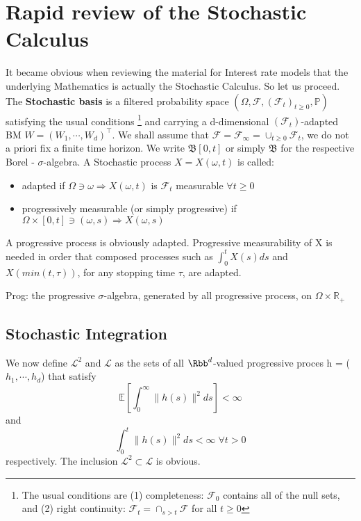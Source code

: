 \section{Rapid review of the Stochastic Calculus}
It became obvious when reviewing the material for Interest rate models that the underlying Mathematics is actually
the Stochastic Calculus. So let us proceed. 
The \textbf{Stochastic basis} is a filtered probability space $(\Omega, \mathcal{F}, (\mathcal{F}_{t})_{t \geq 0}, \mathbb{P})$
satisfying the usual conditions \footnote{The usual conditions are (1) completeness: $\mathcal{F}_{0}$ contains all of the
null sets, and (2) right continuity: $\mathcal{F}_{t} = \cap_{s > t} \mathcal{F}$ for all $t \geq 0$}
and carrying a d-dimensional $(\mathcal{F}_{t})$-adapted BM $W = (W_1, \cdots, W_d)^{\intercal}$. We shall assume 
that $\mathcal{F} = \mathcal{F}_{\infty} = \cup_{t \geq 0} \mathcal{F}_{t}$, we do not a priori fix a finite time 
horizon. 
 We write $\mathfrak{B}[0,t]$ or simply $\mathfrak{B}$ for the respective Borel - $\sigma$-algebra. A Stochastic
process $X = X(\omega, t)$ is called: 
\begin{itemize}
 \item adapted if $\Omega \ni \omega \Rightarrow X(\omega,t)$ is $\mathcal{F}_{t}$ measurable $\forall t \geq 0$
\item progressively measurable (or simply progressive) if $\Omega \times [0,t] \ni (\omega, s) \Rightarrow X(\omega, s)$

\end{itemize}
A progressive process is obviously adapted. Progressive measurability of X is needed in order that composed
processes such as $\int_{0}^{t} X(s)ds$ and $X(min(t, \tau))$, for any stopping time $\tau$, are adapted. 
 \begin{dfn}
  Prog: the progressive $\sigma$-algebra, generated by all progressive process, on $\Omega \times \mathbb{R}_{+}$
 \end{dfn}
\subsection{Stochastic Integration} 
We now define $\mathcal{L}^{2}$ and $\mathcal{L}$ as the sets of all $\Rbb^{d}$-valued progressive proces 
h = ($h_1, \cdots, h_d$) that satisfy 
\begin{equation}
 \mathbb{E}[\int_{0}^{\infty} \|h(s) \|^{2} ds] \lt \infty
\end{equation}
and 
\begin{equation}
 \int_{0}^{t} \|h(s)\|^{2} ds \lt \infty \; \forall t \gt 0
\end{equation}
respectively. The inclusion $\mathcal{L}^{2} \subset \mathcal{L}$ is obvious.